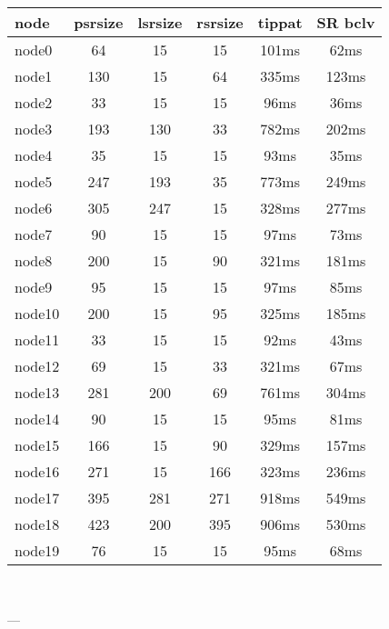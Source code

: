 

\begin{tabular}{|l|c|c|c|c|c|}
\hline node & psrsize & lsrsize & rsrsize   & tippat & SR bclv\\
    \hline node0 & 64 & 15 & 15 & 101ms & 62ms\\
    \hline node1 & 130 & 15 & 64 & 335ms & 123ms\\
    \hline node2 & 33 & 15 & 15 & 96ms & 36ms\\
    \hline node3 & 193 & 130 & 33 & 782ms & 202ms\\
    \hline node4 & 35 & 15 & 15 & 93ms & 35ms\\
    \hline node5 & 247 & 193 & 35 & 773ms & 249ms\\
    \hline node6 & 305 & 247 & 15 & 328ms & 277ms\\
    \hline node7 & 90 & 15 & 15 & 97ms & 73ms\\
    \hline node8 & 200 & 15 & 90 & 321ms & 181ms\\
    \hline node9 & 95 & 15 & 15 & 97ms & 85ms\\
    \hline node10 & 200 & 15 & 95 & 325ms & 185ms\\
    \hline node11 & 33 & 15 & 15 & 92ms & 43ms\\
    \hline node12 & 69 & 15 & 33 & 321ms & 67ms\\
    \hline node13 & 281 & 200 & 69 & 761ms & 304ms\\
    \hline node14 & 90 & 15 & 15 & 95ms & 81ms\\
    \hline node15 & 166 & 15 & 90 & 329ms & 157ms\\
    \hline node16 & 271 & 15 & 166 & 323ms & 236ms\\
    \hline node17 & 395 & 281 & 271 & 918ms & 549ms\\
    \hline node18 & 423 & 200 & 395 & 906ms & 530ms\\
    \hline node19 & 76 & 15 & 15 & 95ms & 68ms\\

\hline
\end{tabular} \

---


